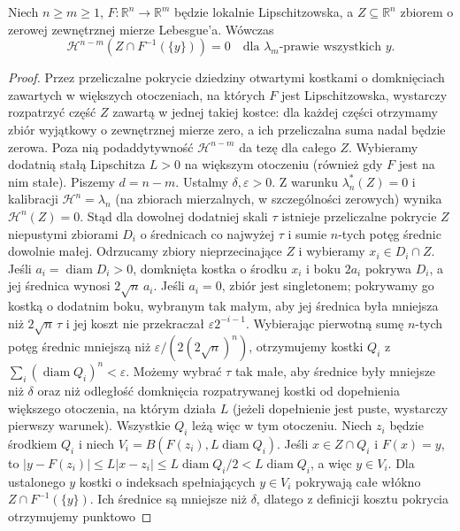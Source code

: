 \begin{lemat}
\label{lem:null-fibres-lipschitz-28}
Niech $n\ge m\ge1$, $F:\mathbb R^n\to\mathbb R^m$
będzie lokalnie Lipschitzowska, a
$Z\subseteq\mathbb R^n$ zbiorem o zerowej zewnętrznej
mierze Lebesgue'a. Wówczas
\[
 \mathcal H^{n-m}(Z\cap F^{-1}(\{y\}))=0
 \quad\text{dla }\lambda_m\text{-prawie wszystkich }y.
\]
\end{lemat}
\begin{proof}
Przez przeliczalne pokrycie dziedziny otwartymi
kostkami o domknięciach zawartych w większych otoczeniach,
na których $F$ jest Lipschitzowska, wystarczy rozpatrzyć
część $Z$ zawartą w jednej takiej kostce: dla każdej
części otrzymamy zbiór wyjątkowy o zewnętrznej mierze
zero, a ich przeliczalna suma nadal będzie zerowa.
Poza nią podaddytywność $\mathcal H^{n-m}$ da tezę
dla całego $Z$. Wybieramy dodatnią
stałą Lipschitza $L>0$ na większym otoczeniu (również
gdy $F$ jest na nim stałe).
Piszemy $d=n-m$. Ustalmy $\delta,\varepsilon>0$.
Z warunku $\lambda_n^*(Z)=0$ i kalibracji
$\mathcal H^n=\lambda_n$ (na zbiorach mierzalnych,
w szczególności zerowych) wynika $\mathcal H^n(Z)=0$.
Stąd dla dowolnej dodatniej skali $\tau$ istnieje
przeliczalne pokrycie $Z$ niepustymi zbiorami
$D_i$ o średnicach co najwyżej $\tau$ i sumie
$n$-tych potęg średnic dowolnie małej. Odrzucamy
zbiory nieprzecinające $Z$ i wybieramy $x_i\in D_i\cap Z$.
Jeśli $a_i=\operatorname{diam}D_i>0$, domknięta
kostka o środku $x_i$ i boku $2a_i$ pokrywa $D_i$,
a jej średnica wynosi $2\sqrt n\,a_i$.
Jeśli $a_i=0$, zbiór jest singletonem; pokrywamy
go kostką o dodatnim boku, wybranym tak małym,
aby jej średnica była mniejsza niż $2\sqrt n\,\tau$
i jej koszt nie przekraczał $\varepsilon 2^{-i-1}$.
Wybierając pierwotną sumę $n$-tych potęg średnic
mniejszą niż $\varepsilon/(2(2\sqrt n)^n)$,
otrzymujemy kostki $Q_i$ z
$\sum_i(\operatorname{diam}Q_i)^n<\varepsilon$.
Możemy wybrać $\tau$ tak małe, aby średnice były
mniejsze niż $\delta$ oraz niż odległość domknięcia
rozpatrywanej kostki od dopełnienia większego otoczenia,
na którym działa $L$ (jeżeli dopełnienie jest puste,
wystarczy pierwszy warunek). Wszystkie $Q_i$ leżą więc
w tym otoczeniu.
Niech $z_i$ będzie środkiem $Q_i$ i niech
$V_i=B(F(z_i),L\operatorname{diam}Q_i)$.
Jeśli $x\in Z\cap Q_i$ i $F(x)=y$, to
$|y-F(z_i)|\le L|x-z_i|\le L\operatorname{diam}Q_i/2
<L\operatorname{diam}Q_i$, a więc $y\in V_i$.
Dla ustalonego $y$ kostki o indeksach spełniających
$y\in V_i$ pokrywają całe włókno $Z\cap F^{-1}(\{y\})$.
Ich średnice są mniejsze niż $\delta$, dlatego
z definicji kosztu pokrycia otrzymujemy punktowo

\end{proof}
